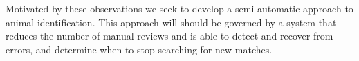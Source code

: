         Motivated by these observations we seek to develop a semi-automatic approach to animal identification. This
        approach will should be governed by a system that reduces the number of manual reviews and is able to detect and
        recover from errors, and determine when to stop searching for new matches.



              
        \RankFigure{}

